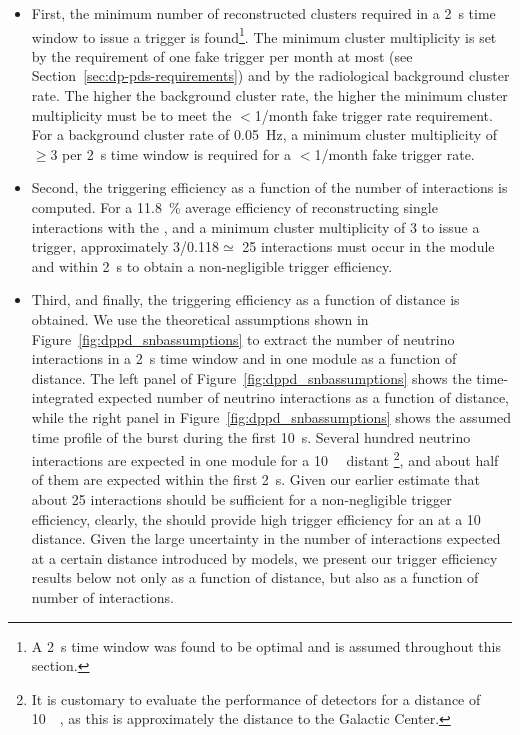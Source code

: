 \begin{itemize}
\item First, the minimum number of reconstructed clusters required in a \SI{2}{\s} time window  to issue a trigger is found\footnote{A \SI{2}{\s} time window was found to be optimal and is assumed throughout this section.}. The minimum cluster multiplicity is set by the requirement of one fake trigger per month at most (see Section~\ref{sec:dp-pds-requirements}) and by the radiological background cluster rate. The higher the background cluster rate, the higher the minimum cluster multiplicity must be to meet the $<$\num{1}/month fake trigger rate requirement. For a background cluster rate of \SI{0.05}{\Hz}, a minimum cluster multiplicity of $\ge$\num{3} per \SI{2}{\s} time window is required for a $<$\num{1}/month fake trigger rate.
%
\item Second, the  triggering efficiency as a function of the number of  interactions is computed. For a \SI{11.8}{\%} average efficiency of reconstructing single  \nue interactions with the , and a minimum cluster multiplicity of \num{3} to issue a trigger, approximately \num{3}/\num{0.118}$\simeq$ \num{25} interactions must occur in the  module and within \SI{2}{\s} to obtain a non-negligible trigger efficiency. 
%
\item Third, and finally, the  triggering efficiency as a function of  distance is obtained. We use the theoretical assumptions shown in Figure~\ref{fig:dppd_snbassumptions} to extract the number of  neutrino interactions in a \SI{2}{\s} time window and in one   module as a function of  distance. The left panel of Figure~\ref{fig:dppd_snbassumptions} shows the time-integrated expected number of  neutrino interactions as a function of distance, while the right panel in Figure~\ref{fig:dppd_snbassumptions} shows the assumed time profile of the burst during the first \SI{10}{\s}. Several hundred  neutrino interactions are expected in one   module for a \SI{10}{\kilo\parsec} distant \footnote{It is customary to evaluate the performance of  detectors for a  distance of \SI{10}{\kilo\parsec}, as this is approximately the distance to the Galactic Center.}, and about half of them are expected within the first \SI{2}{\s}. Given our earlier estimate that about \num{25} interactions should be sufficient for a non-negligible trigger efficiency, clearly, the  should provide high  trigger efficiency for an  at a \SI{10}{\kilo\parsec} distance. Given the large uncertainty in the number of interactions expected at a certain  distance introduced by  models, we present our trigger efficiency results below not only as a function of  distance, but also as a function of number of  interactions. 
\end{itemize}

